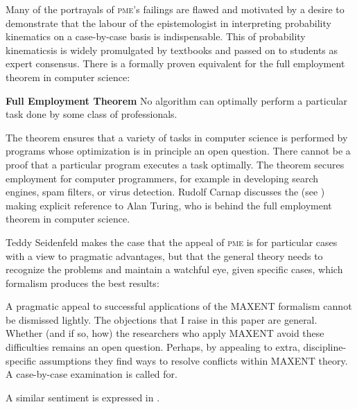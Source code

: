 \documentclass[phd,12pt,oneside]{ubcthesis}
\begin{document}
Many of the portrayals of \textsc{pme}'s failings are flawed and
motivated by a desire to demonstrate that the labour of the
epistemologist in interpreting probability kinematics on a
case-by-case basis is indispensable. This  of probability kinematicsis is widely promulgated by
textbooks and passed on to students as expert consensus. There is a
formally proven equivalent for the full employment theorem in computer
science:

\begin{quotex}
  \textbf{Full Employment Theorem} No algorithm can optimally perform
  a particular task done by some class of professionals.
\end{quotex}

The theorem ensures that a variety of tasks in computer science is
performed by programs whose optimization is in principle an open
question. There cannot be a proof that a particular program executes a
task optimally. The theorem secures employment for computer
programmers, for example in developing search engines, spam filters,
or virus detection. Rudolf Carnap discusses the  (see )
making explicit reference to Alan Turing, who is behind the full
employment theorem in computer science. 

Teddy Seidenfeld makes the case that the appeal of \textsc{pme} is for
particular cases with a view to pragmatic advantages, but that the
general theory needs to recognize the problems and maintain a watchful
eye, given specific cases, which formalism produces the best results:

\begin{quotex}
  A pragmatic appeal to successful applications of the MAXENT
  formalism cannot be dismissed lightly. The objections that I raise
  in this paper are general. Whether (and if so, how) the researchers
  who apply MAXENT avoid these difficulties remains an open question.
  Perhaps, by appealing to extra, discipline-specific assumptions they
  find ways to resolve conflicts within MAXENT theory. A case-by-case
  examination is called for. 
\end{quotex}

A similar sentiment is expressed in .
\end{document}
